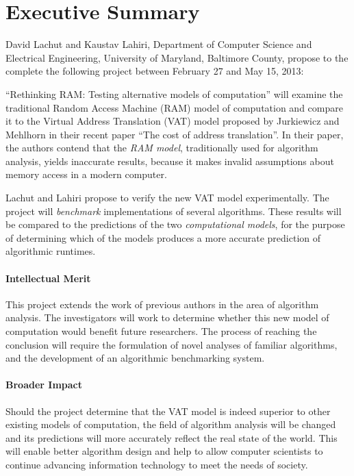 \section{Executive Summary}
  David Lachut and Kaustav Lahiri, Department of Computer Science and
Electrical Engineering, University of Maryland, Baltimore County, propose to
the complete the following project between February 27 and May 15, 2013:
  
  ``Rethinking RAM: Testing alternative models of computation'' will examine
  the traditional Random Access Machine (RAM) model of computation and compare
  it to the Virtual Address Translation (VAT) model proposed by Jurkiewicz and
  Mehlhorn in their recent paper ``The cost of address translation''. In their
  paper, the authors contend that the \textit{RAM model}, traditionally used
  for algorithm analysis, yields inaccurate results, because it makes invalid
  assumptions about memory access in a modern computer. 

  Lachut and Lahiri propose to verify the new VAT model experimentally. The
  project will \textit{benchmark} implementations of several algorithms. These
  results will be compared to the predictions of the two \textit{computational
  models}, for the purpose of determining which of the models produces a more
  accurate prediction of algorithmic runtimes.
  
  \paragraph{Intellectual Merit} This project extends the work of previous
  authors in the area of algorithm analysis. The investigators will work to
  determine whether this new model of computation would benefit future
  researchers. The process of reaching the conclusion will require the
  formulation of novel analyses of familiar algorithms, and the development of
  an algorithmic benchmarking system.
  
  \paragraph{Broader Impact} Should the project determine that the VAT model
  is indeed superior to other existing models of computation, the field of
  algorithm analysis will be changed and its predictions will more accurately
  reflect the real state of the world. This will enable better algorithm design
  and help to allow computer scientists to continue advancing information
  technology to meet the needs of society.
